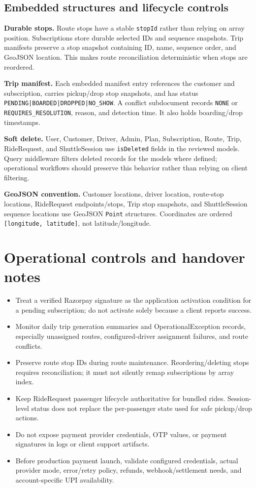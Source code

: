 \documentclass[11pt,a4paper]{article}
\newcommand{\code}[1]{\texttt{#1}}
\begin{document}
\subsection{Embedded structures and lifecycle controls}
\textbf{Durable stops.} Route stops have a stable \code{stopId} rather than relying on array position. Subscriptions store durable selected IDs and sequence snapshots. Trip manifests preserve a stop snapshot containing ID, name, sequence order, and GeoJSON location. This makes route reconciliation deterministic when stops are reordered.

\textbf{Trip manifest.} Each embedded manifest entry references the customer and subscription, carries pickup/drop stop snapshots, and has status \code{PENDING|BOARDED|DROPPED|NO\_SHOW}. A conflict subdocument records \code{NONE} or \code{REQUIRES\_RESOLUTION}, reason, and detection time. It also holds boarding/drop timestamps.

\textbf{Soft delete.} User, Customer, Driver, Admin, Plan, Subscription, Route, Trip, RideRequest, and ShuttleSession use \code{isDeleted} fields in the reviewed models. Query middleware filters deleted records for the models where defined; operational workflows should preserve this behavior rather than relying on client filtering.

\textbf{GeoJSON convention.} Customer locations, driver location, route-stop locations, RideRequest endpoints/stops, Trip stop snapshots, and ShuttleSession sequence locations use GeoJSON \code{Point} structures. Coordinates are ordered \code{[longitude, latitude]}, not latitude/longitude.

\section{Operational controls and handover notes}
\begin{itemize}
  \item Treat a verified Razorpay signature as the application activation condition for a pending subscription; do not activate solely because a client reports success.
  \item Monitor daily trip generation summaries and OperationalException records, especially unassigned routes, configured-driver assignment failures, and route conflicts.
  \item Preserve route stop IDs during route maintenance. Reordering/deleting stops requires reconciliation; it must not silently remap subscriptions by array index.
  \item Keep RideRequest passenger lifecycle authoritative for bundled rides. Session-level status does not replace the per-passenger state used for safe pickup/drop actions.
  \item Do not expose payment provider credentials, OTP values, or payment signatures in logs or client support artifacts.
  \item Before production payment launch, validate configured credentials, actual provider mode, error/retry policy, refunds, webhook/settlement needs, and account-specific UPI availability.
\end{itemize}
\end{document}
